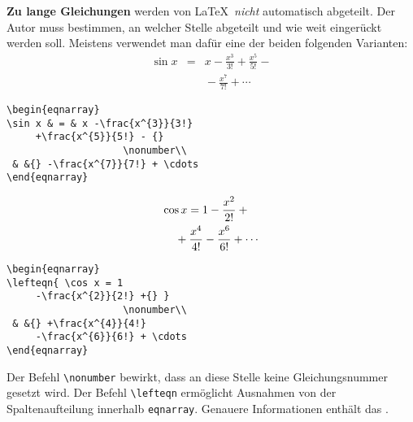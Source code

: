 \textbf{Zu lange Gleichungen} werden von \LaTeX\ \textit{nicht}
automatisch abgeteilt.
Der Autor muss bestimmen, an welcher Stelle abgeteilt und wie
weit eingerückt werden soll.
Meistens verwendet man dafür eine der beiden folgenden
Varianten:
\exa
\begin{eqnarray}
\sin x & = & x -\frac{x^{3}}{3!}
     +\frac{x^{5}}{5!} - {} %
                    \nonumber\\
 & &{} -\frac{x^{7}}{7!} + \cdots %
\end{eqnarray}
\exb
\begin{verbatim}
\begin{eqnarray}
\sin x & = & x -\frac{x^{3}}{3!}
     +\frac{x^{5}}{5!} - {} 
                    \nonumber\\
 & &{} -\frac{x^{7}}{7!} + \cdots
\end{eqnarray}
\end{verbatim}
\exc
\exa
\begin{eqnarray}
\lefteqn{ \cos x = 1
     -\frac{x^{2}}{2!} + {} }
                    \nonumber\\
 & & {} +\frac{x^{4}}{4!}
     -\frac{x^{6}}{6!} + \cdots
\end{eqnarray}
\exb
\begin{verbatim}
\begin{eqnarray}
\lefteqn{ \cos x = 1
     -\frac{x^{2}}{2!} +{} }
                    \nonumber\\
 & &{} +\frac{x^{4}}{4!}
     -\frac{x^{6}}{6!} + \cdots
\end{eqnarray}
\end{verbatim}
\exc
Der Befehl \verb|\nonumber| bewirkt, dass an diese Stelle keine
Gleichungsnummer gesetzt wird.
Der Befehl \verb|\lefteqn| ermöglicht Ausnahmen von der
Spaltenaufteilung innerhalb \texttt{eqnarray}. 
Genauere Informationen enthält das \manual.

\endinput
